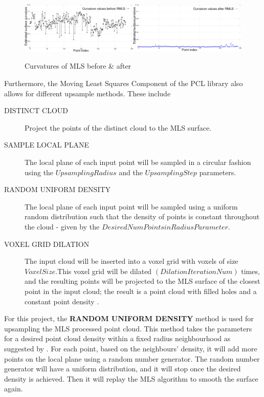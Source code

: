 \documentclass[12pt]{report}
\begin{document}
\begin{figure}[H]%
  \centering
  \includegraphics[width=1\textwidth]{resampling_2.jpg}
 \caption{Curvatures of MLS before \& after}\cite[]{Rusu_ICRA2011_PCL}
 \label{fig:smoothing_curvature} 
\end{figure}

Furthermore, the Moving Least Squares Component of the PCL library also allows for different upsample methods. 
These include 
\begin{description}
  \item[DISTINCT CLOUD] Project the points of the distinct cloud to the MLS surface\cite[]{Rusu_ICRA2011_PCL}.
  \item[SAMPLE LOCAL PLANE] The local plane of each input point will be sampled in a circular fashion using the $UpsamplingRadius$  and the $UpsamplingStep$ parameters\cite[]{Rusu_ICRA2011_PCL}. 
  \item[RANDOM UNIFORM DENSITY] The local plane of each input point will be sampled using a uniform random distribution such that the density of points is constant throughout the cloud - given by the $Desired Num Points in Radius Parameter$\cite[]{Rusu_ICRA2011_PCL}. 
  \item[VOXEL GRID DILATION] The input cloud will be inserted into a voxel grid with voxels of size $Voxel Size$.This voxel grid will be dilated $(Dilation Iteration Num)$ times, and the resulting points will be projected to the MLS surface of the closest point in the input cloud; the result is a point cloud with filled holes and a constant point density \cite[]{Rusu_ICRA2011_PCL}.
\end{description}

For this project,  the \textbf {RANDOM UNIFORM DENSITY} method is used for upsampling the MLS processed point cloud. 
This method takes the parameters for a desired point cloud density within a fixed radius neighbourhood as suggested by . 
For each point, based on the neighbours' density, it will add more points on the local plane using a random number generator.
The random number generator will have a uniform distribution, and it will stop once the desired density is achieved. Then it will replay the MLS algorithm to smooth the surface again.
\end{document}
